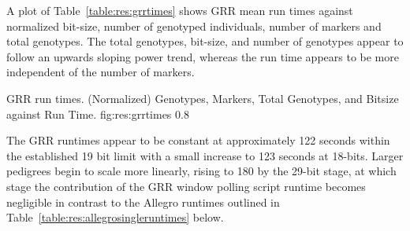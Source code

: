 A plot of Table~\ref{table:res:grrtimes} shows GRR mean run times against normalized bit-size, number of genotyped individuals, number of markers and total genotypes. The total genotypes, bit-size, and number of genotypes appear to follow an upwards sloping power trend, whereas the run time appears to be more independent of the number of markers.

	{GRR run times. (Normalized) Genotypes, Markers, Total Genotypes, and Bitsize against Run Time.}
	{fig:res:grrtimes}
	{0.8}


The GRR runtimes appear to be constant at approximately 122 seconds within the established 19 bit limit with a small increase to 123 seconds at 18-bits. Larger pedigrees begin to scale more linearly, rising to 180 by the 29-bit stage, at which stage the contribution of the GRR window polling script runtime becomes negligible in contrast to the Allegro runtimes outlined in Table~\ref{table:res:allegrosingleruntimes} below.



